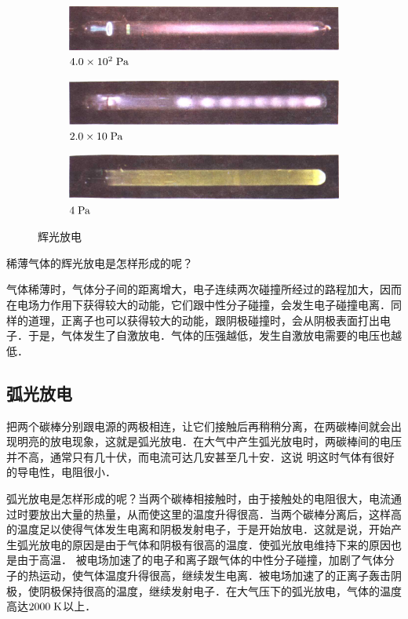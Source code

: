 \begin{figure}[htbp]
	\centering
	\begin{subfigure}{0.86\linewidth}
		\centering
		\includegraphics{fig/B/0-4a.png}
		\caption{$4.0\times10^2 \;\text{Pa}$}\label{fig_B_0-4a}
	\end{subfigure}
	\begin{subfigure}{0.86\linewidth}
		\centering
		\includegraphics{fig/B/0-4b.png}
		\caption{$2.0\times10 \;\text{Pa}$}\label{fig_B_0-4b}
	\end{subfigure}
	\begin{subfigure}{0.86\linewidth}
		\centering
		\includegraphics{fig/B/0-4c.png}
		\caption{$4 \;\text{Pa}$}\label{fig_B_0-4c}
	\end{subfigure}
	\caption{辉光放电}\label{fig_B_0-4}
\end{figure}


稀薄气体的辉光放电是怎样形成的呢？

气体稀薄时，气体分子间的距离增大，电子连续两次碰撞所经过的路程加大，因而在电场力作用下获得较大的动能，它们跟中性分子碰撞，会发生电子碰撞电离．同样的道理，正离子也可以获得较大的动能，跟阴极碰撞时，会从阴极表面打出电子．于是，气体发生了自激放电．气体的压强越低，发生自激放电需要的电压也越低．

\subsection{弧光放电} 

把两个碳棒分别跟电源的两极相连，让它们接触后再稍稍分离，在两碳棒间就会出现明亮的放电现象，这就是弧光放电．在大气中产生弧光放电时，两碳棒间的电压并不高，通常只有几十伏，而电流可达几安甚至几十安．这说
明这时气体有很好的导电性，电阻很小．

弧光放电是怎样形成的呢？当两个碳棒相接触时，由于接触处的电阻很大，电流通过时要放出大量的热量，从而使这里的温度升得很高．当两个碳棒分离后，这样高的温度足以使得气体发生电离和阴极发射电子，于是开始放电．这就是说，开始产生弧光放电的原因是由于气体和阴极有很高的温度．使弧光放电维持下来的原因也是由于高温．
被电场加速了的电子和离子跟气体的中性分子碰撞，加剧了气体分子的热运动，使气体温度升得很高，继续发生电离．被电场加速了的正离子轰击阴极，使阴极保持很高的温度，继续发射电子．在大气压下的弧光放电，气体的温度高达$ 2000\;\text{K} $以上．

